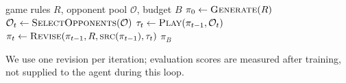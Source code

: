%
%
\begin{algorithm}[b]
\caption{Adversarial heuristic learning. A generative agent observes the interaction between
the policy agent and its environment, then generates or revises the policy agent.
Each round selects an opponent subset and returns a revised policy.}
\label{alg:loop}
\begin{algorithmic}[1]
  \Require game rules $R$, opponent pool $\mathcal{O}$, budget $B$
  \State $\pi_0 \gets \Call{Generate}{R}$
    \State $\mathcal{O}_t \gets \Call{SelectOpponents}{\mathcal{O}}$
    \State $\tau_t \gets \Call{Play}{\pi_{t-1}, \mathcal{O}_t}$
    \State $\pi_t \gets \Call{Revise}{\pi_{t-1}, R, \textsc{src}(\pi_{t-1}), \tau_t}$
  \EndFor
  \State \Return $\pi_B$
\end{algorithmic}
\end{algorithm}

We use one revision per iteration; evaluation scores are measured after training,
not supplied to the agent during this loop.

